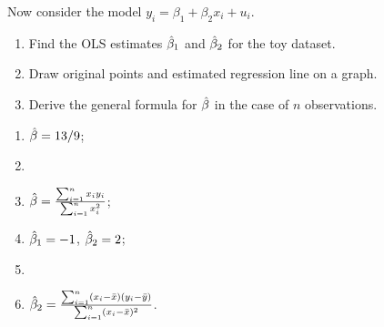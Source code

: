 \begin{problem}
\begin{translation-en}
Now consider the model $y_i = \beta_1 + \beta_2 x_i + u_i$.
\begin{enumerate}[resume]
\item Find the OLS estimates $\hat{\beta}_1$ and $\hat{\beta}_2$ for the toy dataset.
\item Draw original points and estimated regression line on a graph.
\item Derive the general formula for $\hat{\beta}$ in the case of $n$ observations.
\end{enumerate}
\end{translation-en}

\begin{sol}
\begin{enumerate}
\item $\hat{\beta} = 13/9$;
\item 
\item $\hat{\beta} = \frac{\sum_{i=1}^n x_i y_i}{\sum_{i=1}^n x_i^2}$;
\item $\hat{\beta}_1 = -1$, $\hat{\beta}_2 = 2$;
\item 
\item $\hat{\beta}_2 = \frac{\sum_{i=1}^n (x_i - \bar x)(y_i - \bar y)}{\sum_{i=1}^n (x_i - \bar x)^2}$.
\end{enumerate}
\end{sol}
\end{problem}


